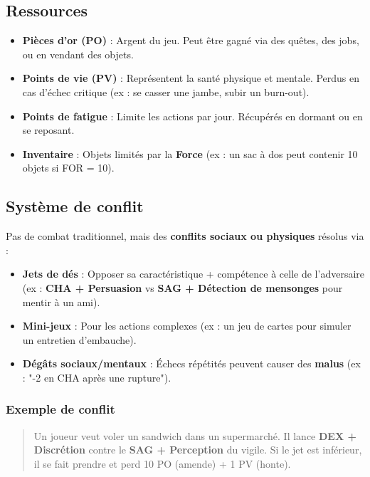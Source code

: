 \documentclass[11pt, a4paper]{article}
\begin{document}
\subsection{Ressources}
\begin{itemize}
    \item \textbf{Pièces d'or (PO)} : Argent du jeu. Peut être gagné via des quêtes, des jobs, ou en vendant des objets.
    \item \textbf{Points de vie (PV)} : Représentent la santé physique et mentale. Perdus en cas d'échec critique (ex : se casser une jambe, subir un burn-out).
    \item \textbf{Points de fatigue} : Limite les actions par jour. Récupérés en dormant ou en se reposant.
    \item \textbf{Inventaire} : Objets limités par la \textbf{Force} (ex : un sac à dos peut contenir 10 objets si FOR = 10).
\end{itemize}

\subsection{Système de conflit}
Pas de combat traditionnel, mais des \textbf{conflits sociaux ou physiques} résolus via :
\begin{itemize}
    \item \textbf{Jets de dés} : Opposer sa caractéristique + compétence à celle de l'adversaire (ex : \textbf{CHA + Persuasion} vs \textbf{SAG + Détection de mensonges} pour mentir à un ami).
    \item \textbf{Mini-jeux} : Pour les actions complexes (ex : un jeu de cartes pour simuler un entretien d'embauche).
    \item \textbf{Dégâts sociaux/mentaux} : Échecs répétités peuvent causer des \textbf{malus} (ex : "-2 en CHA après une rupture").
\end{itemize}

\subsubsection{Exemple de conflit}
\begin{quote}
Un joueur veut voler un sandwich dans un supermarché. Il lance \textbf{DEX + Discrétion} contre le \textbf{SAG + Perception} du vigile. Si le jet est inférieur, il se fait prendre et perd 10 PO (amende) + 1 PV (honte).
\end{quote}
\end{document}
